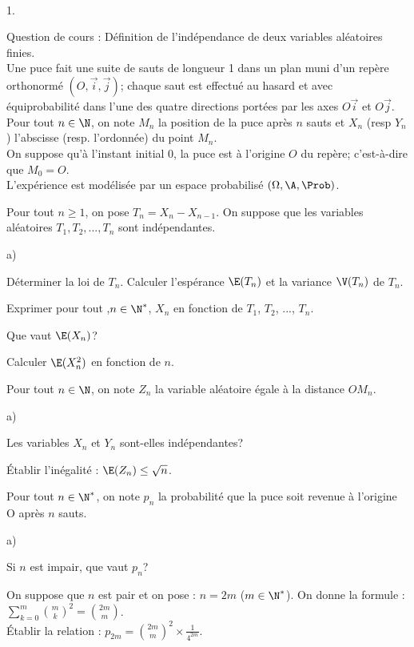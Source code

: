 \documentclass[11pt]{article}%
\begin{document}
\newpage


\begin{exerciceAP}~
  \begin{noliste}{1.}
    \setlength{\itemsep}{2mm}
  \item Question de cours : Définition de l'indépendance de deux
    variables aléatoires finies.\\ 
    Une puce fait une suite de sauts de longueur 1 dans un plan muni
    d'un repère orthonormé $(O, \vec{i}, \vec{j})$; chaque saut est
    effectué au hasard et avec équiprobabilité dans l'une des quatre
    directions portées par les axes $O \vec{i}$ et $O \vec{j}$.\\ 
    Pour tout $n \in \N$, on note $M_n$ la position de la puce après
    $n$ sauts et $X_n$ (resp $Y_n$) l'abscisse (resp. l'ordonnée) du
    point $M_n$.\\ 
    On suppose qu'à l'instant initial 0, la puce est à l'origine $O$
    du repère; c'est-à-dire que $M_0=O$.\\ 
    L'expérience est modélisée par un espace probabilisé $(\Omega, \A,
    \Prob)$.
  \item Pour tout $n \geq 1$, on pose $T_n= X_n- X_{n-1}$. On suppose
    que les variables aléatoires $T_1, T_2, ..., T_n$ sont
    indépendantes. 
    \begin{noliste}{a)}
    \setlength{\itemsep}{2mm}
    \item Déterminer la loi de $T_n$. Calculer l'espérance $\E(T_n)$
      et la variance $\V(T_n)$ de $T_n$.
    \item Exprimer pour tout ,$n \in \N^*$, $X_n$ en fonction de
      $T_1$, $T_2$, ..., $T_n$.
    \item Que vaut $\E(X_n)$?
    \item Calculer $\E(X_n^2)$ en fonction de $n$.
    \end{noliste}
  \item Pour tout $n \in \N$, on note $Z_n$ la variable aléatoire
    égale à la distance $O M_n$.
    \begin{noliste}{a)}
    \setlength{\itemsep}{2mm}
    \item Les variables $X_n$ et $Y_n$ sont-elles indépendantes?
    \item Établir l'inégalité : $\E(Z_n) \leq \sqrt{n}$.
    \end{noliste}
  \item Pour tout $n \in \N^*$, on note $p_n$ la probabilité que la
    puce soit revenue à l'origine O après $n$ sauts.
    \begin{noliste}{a)}
    \setlength{\itemsep}{2mm}
    \item Si $n$ est impair, que vaut $p_n$? 
    \item On suppose que $n$ est pair et on pose : $n=2m$ ($m \in
      \N^*$). On donne la formule : $\sum \limits_{k=0}^m \binom{m}{k}
      ^2 = \binom{2m}{m}$.\\
      Établir la relation : $p_{2m}= \binom{2m}{m}^2 \times
      \frac{1}{4^{2m}}$.
    \end{noliste}
  \end{noliste}
\end{exerciceAP}
\end{document}
